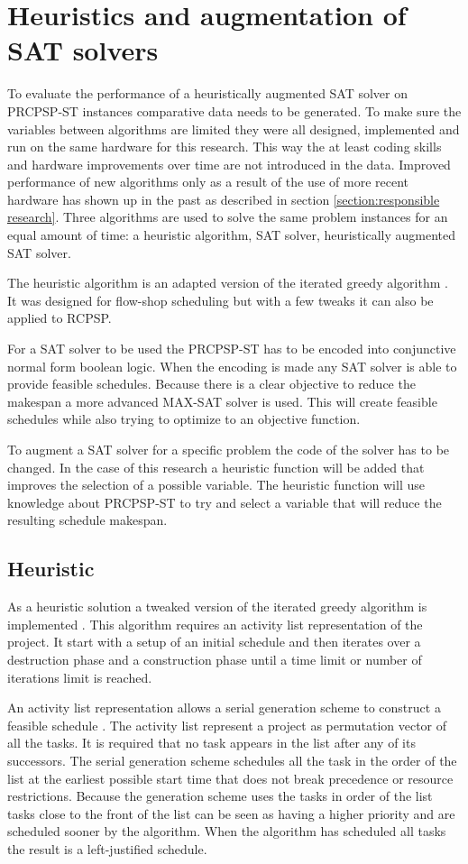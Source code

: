 \section{Heuristics and augmentation of SAT solvers}
To evaluate the performance of a heuristically augmented SAT solver on PRCPSP-ST instances comparative data needs to be generated.  To make sure the variables between algorithms are limited they were all designed, implemented and run on the same hardware for this research. This way the at least coding skills and hardware improvements over time are not introduced in the data. Improved performance of new algorithms only as a result of the use of more recent hardware has shown up in the past as described in section \ref{section:responsible research}. Three algorithms are used to solve the same problem instances for an equal amount of time: a heuristic algorithm, SAT solver, heuristically augmented SAT solver.

The heuristic algorithm is an adapted version of the iterated greedy algorithm \cite{RN32}. It was designed for flow-shop scheduling but with a few tweaks it can also be applied to RCPSP.

For a SAT solver to be used the PRCPSP-ST has to be encoded into conjunctive normal form boolean logic. When the encoding is made any SAT solver is able to provide feasible schedules. Because there is a clear objective to reduce the makespan a more advanced MAX-SAT solver is used. This will create feasible schedules while also trying to optimize to an objective function.

To augment a SAT solver for a specific problem the code of the solver has to be changed. In the case of this research a heuristic function will be added that improves the selection of a possible variable. The heuristic function will use knowledge about PRCPSP-ST to try and select a variable that will reduce the resulting schedule makespan.

\subsection{Heuristic}
As a heuristic solution a tweaked version of the iterated greedy algorithm is implemented \cite{RN32}. This algorithm requires an activity list representation of the project. It start with a setup of an initial schedule and then iterates over a destruction phase and a construction phase until a time limit or number of iterations limit is reached. 

An activity list representation allows a serial generation scheme to construct a feasible schedule \cite{RN46}. The activity list represent a project as permutation vector of all the tasks. It is required that no task appears in the list after any of its successors. The serial generation scheme schedules all the task in the order of the list at the earliest possible start time that does not break precedence or resource restrictions. Because the generation scheme uses the tasks in order of the list tasks close to the front of the list can be seen as having a higher priority and are scheduled sooner by the algorithm. When the algorithm has scheduled all tasks the result is a left-justified schedule.

